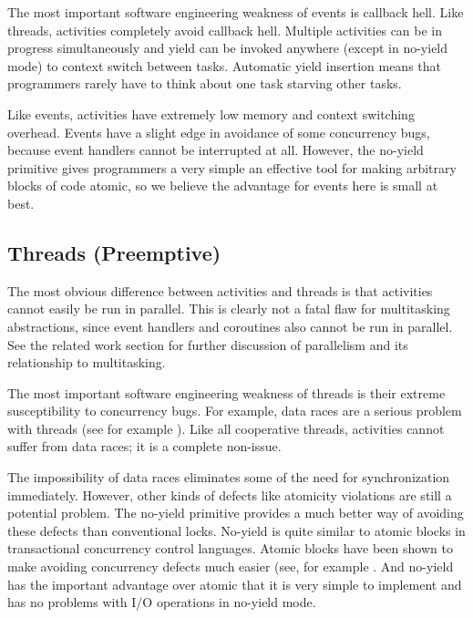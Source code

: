 \documentclass[pldi,10pt,preprint]{sigplanconf-pldi16}
\begin{document}
The most important software engineering weakness of events is callback hell.
Like threads, activities completely avoid callback hell.
Multiple activities can be in progress simultaneously and yield can be invoked anywhere (except in no-yield mode) to context switch between tasks.
Automatic yield insertion means that programmers rarely have to think about one task starving other tasks.

Like events, activities have extremely low memory and context switching overhead.
Events have a slight edge in avoidance of some concurrency bugs, because event handlers cannot be interrupted at all.
However, the no-yield primitive gives programmers a very simple an effective tool for making arbitrary blocks of code atomic, so we believe the advantage for events here is small at best.

\subsection{Threads (Preemptive)}

The most obvious difference between activities and threads is that activities cannot easily be run in parallel.
This is clearly not a fatal flaw for multitasking abstractions, since event handlers and coroutines also cannot be run in parallel.
See the related work section for further discussion of parallelism and its relationship to multitasking.

The most important software engineering weakness of threads is their extreme susceptibility to concurrency bugs.
For example, data races are a serious problem with threads (see for example \cite{Boehm2011}).
Like all cooperative threads, activities cannot suffer from data races; it is a complete non-issue.

The impossibility of data races eliminates some of the need for synchronization immediately.
However, other kinds of defects like atomicity violations are still a potential problem.
The no-yield primitive provides a much better way of avoiding these defects than conventional locks.
No-yield is quite similar to atomic blocks in transactional concurrency control languages.
Atomic blocks have been shown to make avoiding concurrency defects much easier (see, for example \cite{Harris2005, Grossman2007}.
And no-yield has the important advantage over atomic that it is very simple to implement and has no problems with I/O operations in no-yield mode.


\end{document}
